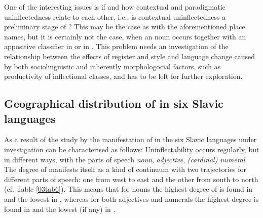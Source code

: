 \documentclass[output=paper,colorlinks,citecolor=brown]{langscibook}
\begin{document}
One of the interesting issues is if and how contextual and paradigmatic uninflectedness relate to each other, i.e., is contextual uninflectedness a preliminary stage of ? This may be the case as with the aforementioned  place names, but it is certainly not the case, when an  noun occurs together with an appositive classifier in  or in . This problem needs an investigation of the relationship between the effects of register and style and language change caused by both sociolinguistic and inherently morphologocial factors, such as productivity of inflectional classes, and has to be left for further exploration.

\subsection{Geographical distribution of  in six Slavic languages}

As a result of the study by \citet{doleschal2000} the manifestation of  in the six Slavic languages under investigation can be characterised as follows: Uninflectability occurs regularly, but in different ways, with the parts of speech \emph{noun}, \emph{adjective}, \emph{(cardinal) numeral}. The degree of  manifests itself as a kind of continuum with two trajectories for different parts of speech: one from west to east and the other from south to north (cf. Table \ref{03tab6}). This means that for nouns the highest degree of  is found in  and the lowest in , whereas for both adjectives and numerals the highest degree is found in  and the lowest (if any) in .
\end{document}
